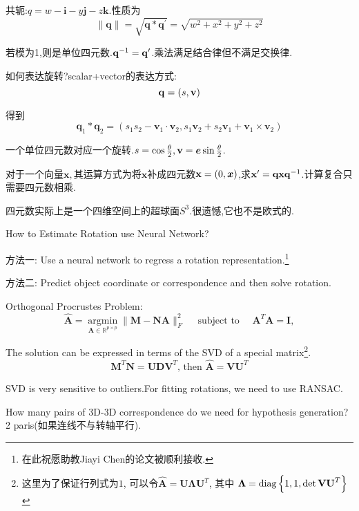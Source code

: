 共轭:$q = w - \bm i - y \bm j - z \bm k.$性质为
\begin{equation}
    \|\mathbf{q}\|=\sqrt{\mathbf{q} * \mathbf{q}^{\prime}}=\sqrt{w^{2}+x^{2}+y^{2}+z^{2}}
\end{equation}

若模为1,则是单位四元数.$\bold{q}^{-1} = \bold{q}^\prime$.乘法满足结合律但不满足交换律.

如何表达旋转?scalar+vector的表达方式:
\begin{equation}
    \bold{q} = (s, \bold{v})
\end{equation}

得到
\begin{equation}
    \mathbf{q}_{1} * \mathbf{q}_{2}=\left(s_{1} s_{2}-\mathbf{v}_{1} \cdot \mathbf{v}_{2}, s_{1} \mathbf{v}_{2}+s_{2} \mathbf{v}_{1}+\mathbf{v}_{1} \times \mathbf{v}_{2}\right)
\end{equation}

一个单位四元数对应一个旋转.$s = \cos \frac{\theta}{2}, \bold{v} = \boldsymbol e \sin \frac{\theta}{2}$.

对于一个向量$\bm x, $其运算方式为将$\bm x$补成四元数$\bold{x} = (0, \boldsymbol x)$,求$\bold{x}^\prime = \bold{q} \bold{x} \bold{q}^{-1}$.计算复合只需要四元数相乘.

四元数实际上是一个四维空间上的超球面$S^3$.很遗憾,它也不是欧式的.

How to Estimate Rotation use Neural Network?

方法一: Use a neural network to regress a rotation representation.\footnote{在此祝愿助教Jiayi Chen的论文被顺利接收.}

方法二: Predict object coordinate or correspondence and then solve 
rotation.

Orthogonal Procrustes Problem:
\begin{equation}
    \widehat{\mathbf{A}}=\underset{\mathbf{A} \in \mathbb{R}^{p \times p}}{\operatorname{argmin}}\|\mathbf{M}-\mathbf{N A}\|_{F}^{2} \quad \text { subject to } \quad \mathbf{A}^{T} \mathbf{A}=\mathbf{I},
\end{equation}

The solution can be expressed in terms of the SVD of a special matrix\footnote{这里为了保证行列式为$1$, 可以令$\widehat{\mathbf{A}}=\mathbf{U} \mathbf{\Lambda} \mathbf{U}^{T}$, 其中 $\mathbf{\Lambda} = \textup{diag}\left\{ 1, 1, \det \mathbf{V U}^{T}\right\}$}.
\begin{equation}
    \mathbf{M}^{T} \mathbf{N}=\mathbf{U D V}^{T} \text {, then } \widehat{\mathbf{A}}=\mathbf{V U}^{T}
\end{equation}

SVD is very sensitive to outliers.For fitting rotations, we need to use RANSAC.

How many pairs of 3D-3D correspondence do we need for hypothesis generation? 2 paris(如果连线不与转轴平行).
